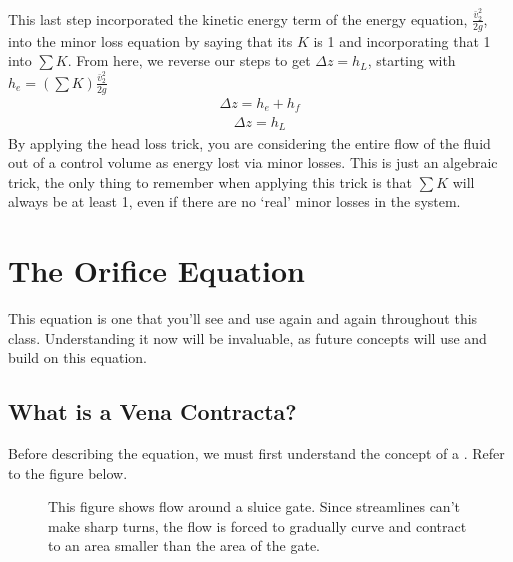 \documentclass[letterpaper,10pt,english]{sphinxmanual}
\let\sphinxpxdimen\pdfpxdimen\else\newdimen\sphinxpxdimen
\begin{document}
This last step incorporated the kinetic energy term of the energy equation, \(\frac{\bar v_2^2}{2g}\), into the minor loss equation by saying that its \(K\) is 1 and incorporating that 1 into \(\sum K\). From here, we reverse our steps to get \(\Delta z = h_L\), starting with \(h_e = \left( \sum K \right) \frac{\bar v_2^2}{2g}\)
\begin{equation}\label{equation:Review/Review_Fluid_Mechanics:Review/Review_Fluid_Mechanics:21}
\begin{split}\Delta z = h_e + h_f\end{split}
\end{equation}\begin{equation}\label{equation:Review/Review_Fluid_Mechanics:Review/Review_Fluid_Mechanics:22}
\begin{split}\Delta z = h_L\end{split}
\end{equation}
By applying the head loss trick, you are considering the entire flow of the fluid out of a control volume as energy lost via minor losses. This is just an algebraic trick, the only thing to remember when applying this trick is that \(\sum K\) will always be at least 1, even if there are no ‘real’ minor losses in the system.


\section{The Orifice Equation}
\label{\detokenize{Review/Review_Fluid_Mechanics:the-orifice-equation}}\label{\detokenize{Review/Review_Fluid_Mechanics:heading-the-orifice-equation}}
This equation is one that you’ll see and use again and again throughout this class. Understanding it now will be invaluable, as future concepts will use and build on this equation.


\subsection{What is a Vena Contracta?}
\label{\detokenize{Review/Review_Fluid_Mechanics:what-is-a-vena-contracta}}\label{\detokenize{Review/Review_Fluid_Mechanics:heading-what-is-a-vena-contracta}}
Before describing the equation, we must first understand the concept of a . Refer to the figure below.

\begin{figure}[htbp]
\centering
\capstart

\noindent\sphinxincludegraphics[width=650\sphinxpxdimen]{{sluice_gate_vena_contracta}.png}
\caption{This figure shows flow around a sluice gate. Since streamlines can’t make sharp turns, the flow is forced to gradually curve and contract to an area smaller than the area of the gate.}\label{\detokenize{Review/Review_Fluid_Mechanics:id10}}\label{\detokenize{Review/Review_Fluid_Mechanics:figure-sluice-gate-vena-contracta}}\end{figure}
\end{document}
